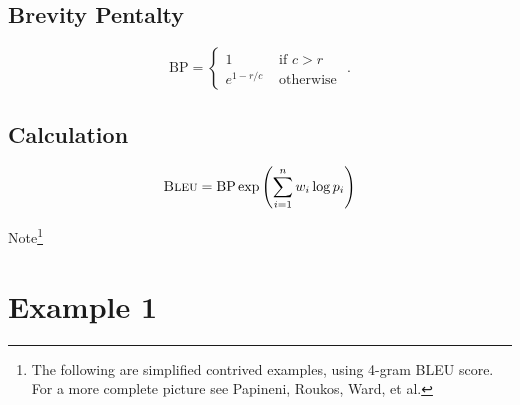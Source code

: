 \hypertarget{brevity-pentalty}{%
\subsection{Brevity Pentalty}\label{brevity-pentalty}}

\begin{equation}
 \text{BP} = \begin{cases}1 &\text{ if } c>r \\
  e^{1-r/c} &\text{ otherwise }\end{cases}.
\end{equation}

\hypertarget{calculation}{%
\subsection{Calculation}\label{calculation}}

\begin{equation}
  \text{\textsc{Bleu}} = \text{BP} \exp\left( \sum_{i=1}^n w_i \log p_i \right)
\end{equation}

Note\footnote{The following are simplified contrived examples, using 4-gram BLEU
score. For a more complete picture see Papineni, Roukos, Ward, et al.}

\hypertarget{example-1}{%
\section{Example 1}\label{example-1}}

\begin{Shaded}
\begin{Highlighting}[]
\OperatorTok{=}\NormalTok{ [}
\NormalTok{  [}\NormalTok{, }\NormalTok{, }\NormalTok{, }\NormalTok{,}
  \NormalTok{, }\NormalTok{, }\NormalTok{, }\NormalTok{, }\NormalTok{]}
\NormalTok{]}
\OperatorTok{=}
\NormalTok{  [}\NormalTok{, }\NormalTok{, }\NormalTok{, }\NormalTok{,}
  \NormalTok{, }\NormalTok{, }\NormalTok{, }\NormalTok{, }\NormalTok{]}
\end{Highlighting}
\end{Shaded}

